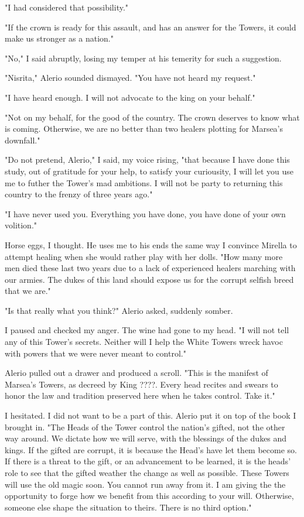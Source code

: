 \documentclass{article}
\begin{document}
"I had considered that possibility."

"If the crown is ready for this assault, and has an answer for the Towers, it could make us stronger as a nation."

"No," I said abruptly, losing my temper at his temerity for such a suggestion.

"Nisrita," Alerio sounded dismayed. "You have not heard my request."

"I have heard enough. I will not advocate to the king on your behalf."

"Not on my behalf, for the good of the country. The crown deserves to know what is coming. Otherwise, we are no better than two healers plotting for Marsea's downfall."

"Do not pretend, Alerio," I said, my voice rising, "that because I have done this study, out of gratitude for your help, to satisfy your curiousity, I will let you use me to futher the Tower's mad ambitions. I will not be party to returning this country to the frenzy of three years ago."

"I have never used you. Everything you have done, you have done of your own volition."

Horse eggs, I thought. He uses me to his ends the same way I convince Mirella to attempt healing when she would rather play with her dolls. "How many more men died these last two years due to a lack of experienced healers marching with our armies. The dukes of this land should expose us for the corrupt selfish breed that we are."

"Is that really what you think?" Alerio asked, suddenly somber.

I paused and checked my anger. The wine had gone to my head. "I will not tell any of this Tower's secrets. Neither will I help the White Towers wreck havoc with powers that we were never meant to control."

Alerio pulled out a drawer and produced a scroll. "This is the manifest of Marsea's Towers, as decreed by King ????. Every head recites and swears to honor the law and tradition preserved here when he takes control. Take it."

I hesitated. I did not want to be a part of this. Alerio put it on top of the book I brought in. "The Heads of the Tower control the nation's gifted, not the other way around. We dictate how we will serve, with the blessings of the dukes and kings. If the gifted are corrupt, it is because the Head's have let them become so. If there is a threat to the gift, or an advancement to be learned, it is the heads' role to see that the gifted weather the change as well as possible. These Towers will use the old magic soon. You cannot run away from it. I am giving the the opportunity to forge how we benefit from this according to your will. Otherwise, someone else shape the situation to theirs. There is no third option."
\end{document}
